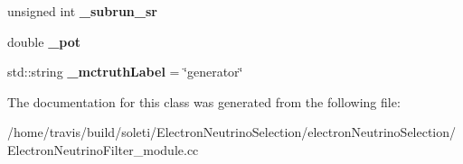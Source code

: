 \begin{DoxyCompactItemize}
\item 
\hypertarget{classlee_1_1ElectronNeutrinoFilter_a4c94603539c2385aa2506873642f4d10}{unsigned int {\bfseries \-\_\-subrun\-\_\-sr}}\label{classlee_1_1ElectronNeutrinoFilter_a4c94603539c2385aa2506873642f4d10}

\item 
\hypertarget{classlee_1_1ElectronNeutrinoFilter_afafabcd6b8132be5b9140806c1edff7c}{double {\bfseries \-\_\-pot}}\label{classlee_1_1ElectronNeutrinoFilter_afafabcd6b8132be5b9140806c1edff7c}

\item 
\hypertarget{classlee_1_1ElectronNeutrinoFilter_a7b91ab5f148464be875c2eb4438d091c}{std\-::string {\bfseries \-\_\-mctruth\-Label} = \char`\"{}generator\char`\"{}}\label{classlee_1_1ElectronNeutrinoFilter_a7b91ab5f148464be875c2eb4438d091c}

\end{DoxyCompactItemize}


The documentation for this class was generated from the following file\-:\begin{DoxyCompactItemize}
\item 
/home/travis/build/soleti/\-Electron\-Neutrino\-Selection/electron\-Neutrino\-Selection/Electron\-Neutrino\-Filter\-\_\-module.\-cc\end{DoxyCompactItemize}
